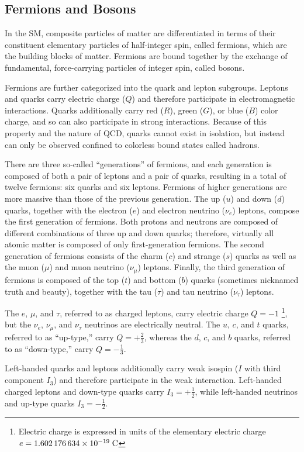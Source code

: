 \begin{refsection}
\subsection{Fermions and Bosons}
In the SM, composite particles of matter are differentiated in terms of their constituent elementary particles of half-integer spin, called fermions, which are the building blocks of matter.
Fermions are bound together by the exchange of fundamental, force-carrying particles of integer spin, called bosons. 

Fermions are further categorized into the quark and lepton subgroups.
Leptons and quarks carry electric charge ($Q$) and therefore participate in electromagnetic interactions.
Quarks additionally carry red ($R$), green ($G$), or blue ($B$) color charge, and so can also participate in strong interactions.
Because of this property and the nature of QCD, quarks cannot exist in isolation, but instead can only be observed confined to colorless bound states called hadrons.

There are three so-called ``generations'' of fermions, and each generation is composed of both a pair of leptons and a pair of quarks, resulting in a total of twelve fermions: six quarks and six leptons.
Fermions of higher generations are more massive than those of the previous generation.
The up ($u$) and down ($d$) quarks, together with the electron ($e$) and electron neutrino ($\nu_e$) leptons, compose the first generation of fermions.
Both protons and neutrons are composed of different combinations of three up and down quarks; therefore, virtually all atomic matter is composed of only first-generation fermions.
The second generation of fermions consists of the charm ($c$) and strange ($s$) quarks as well as the muon ($\mu$) and muon neutrino ($\nu_\mu$) leptons.
Finally, the third generation of fermions is composed of the top ($t$) and bottom ($b$) quarks (sometimes nicknamed truth and beauty), together with the tau ($\tau$) and tau neutrino ($\nu_\tau$) leptons.

The $e$, $\mu$, and $\tau$, referred to as charged leptons, carry electric charge $Q = -1$ \footnote{Electric charge is expressed in units of the elementary electric charge $e = \num{1.602176634e-19} \; \si{\C}$}, but the $\nu_e$, $\nu_\mu$, and $\nu_\tau$ neutrinos are electrically neutral.
The $u$, $c$, and $t$ quarks, referred to as ``up-type,'' carry $Q = +\frac{2}{3}$, whereas the $d$, $c$, and $b$ quarks, referred to as ``down-type,'' carry $Q = -\frac{1}{3}$.

Left-handed quarks and leptons additionally carry weak isospin ($I$ with third component $I_3$) and therefore participate in the weak interaction.
Left-handed charged leptons and down-type quarks carry $I_3 = +\frac{1}{2}$, while left-handed neutrinos and up-type quarks $I_3 = -\frac{1}{2}$.


\end{refsection}
